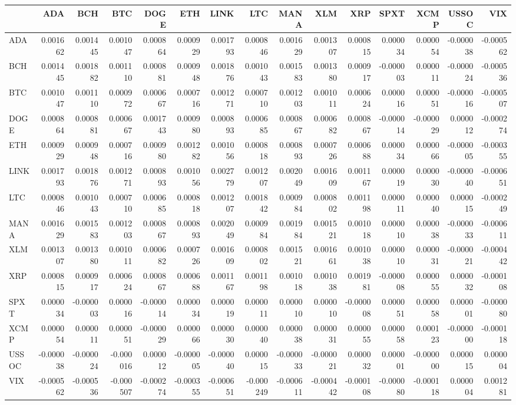 \begin{tabular}{lrrrrrrrrrrrrrr}
\toprule
 & ADA & BCH & BTC & DOGE & ETH & LINK & LTC & MANA & XLM & XRP & SPXT & XCMP & USSOC & VIX \\
\midrule
ADA & 0.001662 & 0.001445 & 0.001047 & 0.000864 & 0.000929 & 0.001793 & 0.000846 & 0.001629 & 0.001307 & 0.000815 & 0.000034 & 0.000054 & -0.000038 & -0.000562 \\
BCH & 0.001445 & 0.001882 & 0.001110 & 0.000881 & 0.000948 & 0.001876 & 0.001043 & 0.001583 & 0.001380 & 0.000917 & -0.000003 & 0.000011 & -0.000024 & -0.000536 \\
BTC & 0.001047 & 0.001110 & 0.000972 & 0.000667 & 0.000716 & 0.001271 & 0.000710 & 0.001203 & 0.001011 & 0.000624 & 0.000016 & 0.000051 & -0.000016 & -0.000507 \\
DOGE & 0.000864 & 0.000881 & 0.000667 & 0.001743 & 0.000980 & 0.000893 & 0.000685 & 0.000867 & 0.000682 & 0.000867 & -0.000014 & -0.000029 & 0.000012 & -0.000274 \\
ETH & 0.000929 & 0.000948 & 0.000716 & 0.000980 & 0.001282 & 0.001056 & 0.000818 & 0.000893 & 0.000726 & 0.000688 & 0.000034 & 0.000066 & -0.000005 & -0.000355 \\
LINK & 0.001793 & 0.001876 & 0.001271 & 0.000893 & 0.001056 & 0.002779 & 0.001207 & 0.002049 & 0.001609 & 0.001167 & 0.000019 & 0.000030 & -0.000040 & -0.000651 \\
LTC & 0.000846 & 0.001043 & 0.000710 & 0.000685 & 0.000818 & 0.001207 & 0.001842 & 0.000984 & 0.000802 & 0.001198 & 0.000011 & 0.000040 & 0.000015 & -0.000249 \\
MANA & 0.001629 & 0.001583 & 0.001203 & 0.000867 & 0.000893 & 0.002049 & 0.000984 & 0.001984 & 0.001521 & 0.001018 & 0.000010 & 0.000038 & -0.000033 & -0.000611 \\
XLM & 0.001307 & 0.001380 & 0.001011 & 0.000682 & 0.000726 & 0.001609 & 0.000802 & 0.001521 & 0.001661 & 0.001038 & 0.000010 & 0.000031 & -0.000021 & -0.000442 \\
XRP & 0.000815 & 0.000917 & 0.000624 & 0.000867 & 0.000688 & 0.001167 & 0.001198 & 0.001018 & 0.001038 & 0.001981 & -0.000008 & 0.000055 & 0.000032 & -0.000108 \\
SPXT & 0.000034 & -0.000003 & 0.000016 & -0.000014 & 0.000034 & 0.000019 & 0.000011 & 0.000010 & 0.000010 & -0.000008 & 0.000051 & 0.000058 & 0.000001 & -0.000080 \\
XCMP & 0.000054 & 0.000011 & 0.000051 & -0.000029 & 0.000066 & 0.000030 & 0.000040 & 0.000038 & 0.000031 & 0.000055 & 0.000058 & 0.000123 & -0.000000 & -0.000118 \\
USSOC & -0.000038 & -0.000024 & -0.000016 & 0.000012 & -0.000005 & -0.000040 & 0.000015 & -0.000033 & -0.000021 & 0.000032 & 0.000001 & -0.000000 & 0.000015 & 0.000004 \\
VIX & -0.000562 & -0.000536 & -0.000507 & -0.000274 & -0.000355 & -0.000651 & -0.000249 & -0.000611 & -0.000442 & -0.000108 & -0.000080 & -0.000118 & 0.000004 & 0.001281 \\
\bottomrule
\end{tabular}
